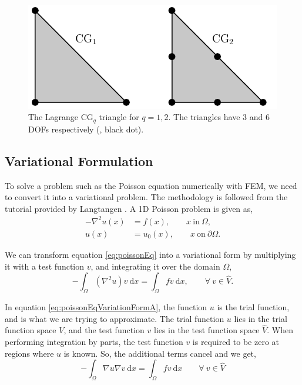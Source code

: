 	\begin{figure}[t]
	\centering
	\includegraphics[width=0.6\linewidth]{./figures/eulerian/continuousGalerkin.pdf}
	\caption{The Lagrange $\mathrm{CG}_q$ triangle for $q = 1, 2$. The triangles have $3$ and $6$ DOFs respectively ({\color{black}{$\bullet$}}, black dot).}
	\label{fig:continuousGalerkin}
	\end{figure}



\subsection*{Variational Formulation}
\label{subsec:variationalProblem}

To solve a problem such as the Poisson equation numerically with FEM, we need to convert it into a variational problem. The methodology is followed from the \fenics tutorial provided by Langtangen \cite{Logg2012b}. A 1D Poisson problem is given as,
	\begin{equation}
	\begin{aligned}
	- \nabla^2 u(x) &= f(x), \qquad x\ \mathrm{in}\ \Omega,\\
	u(x) &= u_0(x), \qquad x\ \mathrm{on}\ \partial\Omega.
	\end{aligned}
	\label{eq:poissonEq}
	\end{equation}
	
We can transform equation \ref{eq:poissonEq} into a variational form by multiplying it with a test function $v$, and integrating it over the domain $\Omega$,
	\begin{equation}
	- \int_{\Omega} \left(\nabla^2 u\right)v\ \mathrm{d}x= \int_{\Omega} fv\ \mathrm{d}x, \qquad \forall\ v \in \hat{V}.
	\label{eq:poissonEqVariationFormA}
	\end{equation}

In equation \ref{eq:poissonEqVariationFormA}, the function $u$ is the trial function, and is what we are trying to approximate. The trial function $u$ lies in the trial function space $V$, and the test function $v$ lies in the test function space $\hat{V}$. When performing integration by parts, the test function $v$ is required to be zero at regions where $u$ is known. So, the additional terms cancel and we get,
	\begin{equation}
	- \int_{\Omega} \nabla u \nabla v\ \mathrm{d}x= \int_{\Omega} fv\ \mathrm{d}x \qquad \forall\ v \in \hat{V}
	\label{eq:poissonEqVariationFormB}
	\end{equation}


